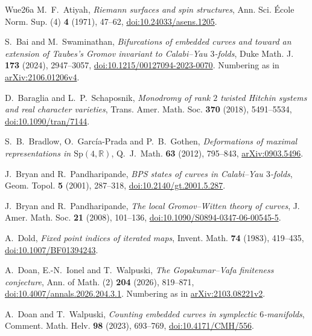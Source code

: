 \begin{thebibliography}{Wue26a}
 M.~F.~Atiyah,
\emph{Riemann surfaces and spin structures}, Ann. Sci. \'Ecole Norm. Sup. (4)
\textbf{4} (1971), 47--62, \href{https://doi.org/10.24033/asens.1205}{doi:10.24033/asens.1205}.

 S.~Bai and M.~Swaminathan,
\emph{Bifurcations of embedded curves and toward an extension of Taubes's
Gromov invariant to Calabi--Yau $3$-folds}, Duke Math. J. \textbf{173}
(2024), 2947--3057,
\href{https://doi.org/10.1215/00127094-2023-0070}{doi:10.1215/00127094-2023-0070}.
Numbering as in \href{https://arxiv.org/abs/2106.01206v4}{arXiv:2106.01206v4}.

 D.~Baraglia and L.~P.~Schaposnik,
\emph{Monodromy of rank $2$ twisted Hitchin systems and real character varieties},
Trans. Amer. Math. Soc. \textbf{370} (2018), 5491--5534,
\href{https://doi.org/10.1090/tran/7144}{doi:10.1090/tran/7144}.

 S.~B.~Bradlow, O.~Garc\'ia-Prada and P.~B.~Gothen, \emph{Deformations of maximal representations in $\mathrm{Sp}(4,\mathbb R)$}, Q.~J.~Math. \textbf{63} (2012), 795--843, \href{https://arxiv.org/abs/0903.5496}{arXiv:0903.5496}.

 J.~Bryan and R.~Pandharipande,
\emph{BPS states of curves in Calabi--Yau $3$-folds},
Geom. Topol. \textbf{5} (2001), 287--318,
\href{https://doi.org/10.2140/gt.2001.5.287}{doi:10.2140/gt.2001.5.287}.

 J.~Bryan and R.~Pandharipande,
\emph{The local Gromov--Witten theory of curves},
J. Amer. Math. Soc. \textbf{21} (2008), 101--136,
\href{https://doi.org/10.1090/S0894-0347-06-00545-5}{doi:10.1090/S0894-0347-06-00545-5}.

 A.~Dold, \emph{Fixed point indices of iterated maps},
Invent. Math. \textbf{74} (1983), 419--435,
\href{https://doi.org/10.1007/BF01394243}{doi:10.1007/BF01394243}.

 A.~Doan, E.-N.~Ionel and T.~Walpuski,
\emph{The Gopakumar--Vafa finiteness conjecture},
Ann. of Math. (2) \textbf{204} (2026), 819--871,
\href{https://doi.org/10.4007/annals.2026.204.3.1}{doi:10.4007/annals.2026.204.3.1}.
Numbering as in \href{https://arxiv.org/abs/2103.08221v2}{arXiv:2103.08221v2}.

 A.~Doan and T.~Walpuski, \emph{Counting embedded curves in symplectic $6$-manifolds}, Comment. Math. Helv. \textbf{98} (2023), 693--769, \href{https://doi.org/10.4171/CMH/556}{doi:10.4171/CMH/556}.


\end{thebibliography}
